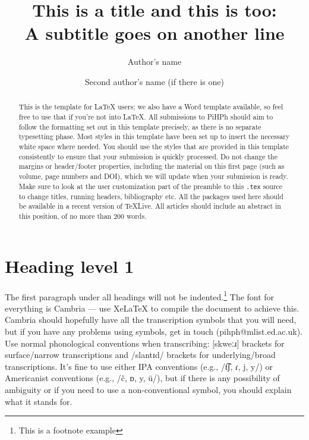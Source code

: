 \documentclass[article, a4paper, 12pt]{memoir}
\date{}
\title{This is a title and this is too:\\A subtitle goes on another line}
\author{Author's name\\\affiliation{Author's affiliation} \and Second author's name (if there is one)\\\affiliation{Second author's affiliation}}
\begin{document}
\setcounter{page}{1}
\maketitle
\thispagestyle{empty}


\begin{abstract}
\noindent This is the template for \LaTeX{} users; we also have a Word template available, so feel free to use that if you're not into \LaTeX. All submissions to PiHPh should aim to follow the formatting set out in this template precisely, as there is no separate typesetting phase. Most styles in this template have been set up to insert the necessary white space where needed. You should use the styles that are provided in this template consistently to ensure that your submission is quickly processed. Do not change the margins or header/footer properties, including the material on this first page (such as volume, page numbers and DOI), which we will update when your submission is ready. Make sure to look at the user customization part of the preamble to this \texttt{.tex} source to change titles, running headers, bibliography etc. All the packages used here should be available in a recent version of \TeX Live. All articles should include an abstract in this position, of no more than 200 words. 
\end{abstract}

\section{Heading level 1}
\label{sec:heading-level-1}

The first paragraph under all headings will not be indented.\footnote{This is a footnote example}  The font for everything is Cambria --- use Xe\LaTeX{} to compile the document to achieve this. Cambria should hopefully have all the transcription symbols that you will need, but if you have any problems using symbols, get in touch (pihph@\hspace{0pt}mlist.ed.ac.uk). Use normal phonological conventions when transcribing: [skweːɹ] brackets for surface/narrow transcriptions and /slantɪd/ brackets for underlying/broad transcriptions. It’s fine to use either IPA conventions (e.g., /t͡ʃ, ɾ, j, y/) or Americanist conventions (e.g., /č, ᴅ, y, ü/), but if there is any possibility of ambiguity or if you need to use a non-conventional symbol, you should explain what it stands for. 
\end{document}

